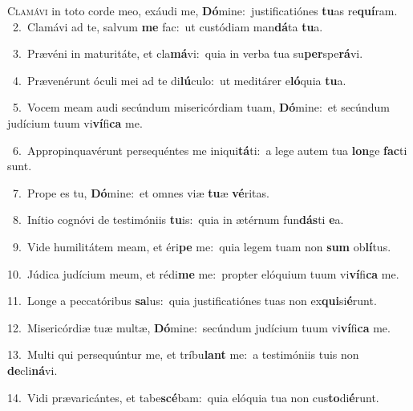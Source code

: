 \lettrine{\initial\textcolor{\initialcolor}{C}}{lamávi} in toto corde meo, exáudi me, \textbf{Dó}\-mine:~\star justificatiónes \textbf{tu}\-as re\-\textbf{quí}\-ram.\\
{\numbfont\textcolor{\numbcolor}{~2.}}~Clamávi ad te, salvum \textbf{me} fac:~\star ut custódiam man\-\textbf{dá}\-ta \textbf{tu}\-a.\par
{\numbfont\textcolor{\numbcolor}{~3.}}~Prævéni in maturitáte, et cla\-\textbf{má}\-vi:~\star quia in verba tua su\-\textbf{per}\-spe\-\textbf{rá}\-vi.\par
{\numbfont\textcolor{\numbcolor}{~4.}}~Prævenérunt óculi mei ad te di\-\textbf{lú}\-culo:~\star ut meditárer e\-\textbf{ló}\-quia \textbf{tu}\-a.\par
{\numbfont\textcolor{\numbcolor}{~5.}}~Vocem meam audi secúndum misericórdiam tuam, \textbf{Dó}\-mine:~\star et secúndum judícium tuum vi\-\textbf{ví}\-fi\textbf{ca} me.\par
{\numbfont\textcolor{\numbcolor}{~6.}}~Appropinquavérunt persequéntes me iniqui\-\textbf{tá}\-ti:~\star a lege autem tua \textbf{lon}\-ge \textbf{fac}\-ti sunt.\par
{\numbfont\textcolor{\numbcolor}{~7.}}~Prope es tu, \textbf{Dó}\-mine:~\star et omnes viæ \textbf{tu}\-æ \textbf{vé}\-ritas.\par
{\numbfont\textcolor{\numbcolor}{~8.}}~Inítio cognóvi de testimóniis \textbf{tu}\-is:~\star quia in ætérnum fun\-\textbf{dás}\-ti \textbf{e}\-a.\par
{\numbfont\textcolor{\numbcolor}{~9.}}~Vide humilitátem meam, et éri\textbf{pe} me:~\star quia legem tuam non \textbf{sum} ob\-\textbf{lí}\-tus.\par
{\numbfont\textcolor{\numbcolor}{10.}}~Júdica judícium meum, et rédi\textbf{me} me:~\star propter elóquium tuum vi\-\textbf{ví}\-fi\textbf{ca} me.\par
{\numbfont\textcolor{\numbcolor}{11.}}~Longe a peccatóribus \textbf{sa}\-lus:~\star quia justificatiónes tuas non ex\-\textbf{qui}\-si\-\textbf{é}\-runt.\par
{\numbfont\textcolor{\numbcolor}{12.}}~Misericórdiæ tuæ multæ, \textbf{Dó}\-mine:~\star secúndum judícium tuum vi\-\textbf{ví}\-fi\textbf{ca} me.\par
{\numbfont\textcolor{\numbcolor}{13.}}~Multi qui persequúntur me, et tríbu\textbf{lant} me:~\star a testimóniis tuis non \textbf{de}\-cli\-\textbf{ná}\-vi.\par
{\numbfont\textcolor{\numbcolor}{14.}}~Vidi prævaricántes, et tabe\-\textbf{scé}\-bam:~\star quia elóquia tua non cus\-\textbf{to}\-di\-\textbf{é}\-runt.\par
